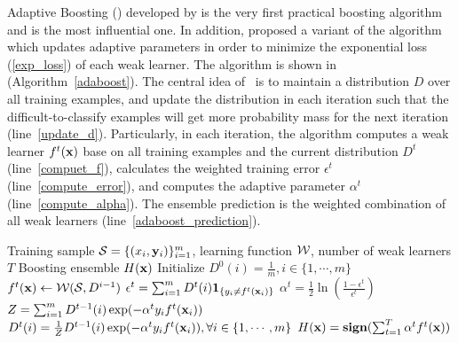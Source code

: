 {Adaptive Boosting (\adaboost) developed by \citet{Freund97a} is the very first practical boosting algorithm and is the most influential one.
In addition, \citet{Schapire99improved} proposed a variant of the algorithm which updates adaptive parameters in order to minimize the exponential loss (\ref{exp_loss}) of each weak learner.
The algorithm is shown in (Algorithm~\ref{adaboost}).
The central idea of \adaboost\ is to maintain a distribution $D$ over all training examples, and update the distribution in each iteration such that the difficult-to-classify examples will get more probability mass for the next iteration (line~\ref{update_d}).
Particularly, in each iteration, the algorithm computes a weak learner $f^t(\mathbf {x})$ base on all training examples and the current distribution $D^{t}$ (line~\ref{compuet_f}), calculates the weighted training error $\epsilon^t$ (line~\ref{compute_error}), and computes the adaptive parameter $\alpha^t$ (line~\ref{compute_alpha}).
The ensemble prediction is the weighted combination of all weak learners (line~\ref{adaboost_prediction}).

\begin{algorithm}
\caption{\adaboost}
\label{adaboost}
\begin{algorithmic}[1]
	\REQUIRE Training sample $\mathcal{S} = \{(x_i,\mathbf {y}_i)\}_{i=1}^m$, learning function $\mathcal{W}$, number of weak learners $T$
	\ENSURE Boosting ensemble $H(\mathbf {x})$
	\STATE Initialize $D^0(i)=\frac{1}{m},i\in\{1,\cdots,m\}$
		\STATE $f^t(\mathbf {x})\leftarrow\mathcal{W}(\mathcal{S},D^{i-1})$ \label{compuet_f}
		\STATE $\epsilon^t = \sum_{i=1}^{m}D^t(i)\mathbf{1}_{\{y_i\neq f^t(\mathbf {x}_i)\}}$ \label{compute_error}
		\STATE $\alpha^{t} = \frac{1}{2}\ln\left(\frac{1-\epsilon^t}{\epsilon^t}\right)$ \label{compute_alpha}
		\STATE $Z=\sum_{i=1}^{m}D^{t-1}(i)\exp(-\alpha^ty_if^t(\mathbf {x}_i))$
		\STATE $D^t(i) = \frac{1}{Z}D^{t-1}(i)\exp(-\alpha^ty_if^t(\mathbf {x}_i)),\forall i\in\{1,\cdots,m\}$ \label{update_d}
	\ENDFOR
	\RETURN $H(\mathbf {x}) = \textbf{sign}(\sum_{t=1}^T\alpha^tf^t(\mathbf {x}))$ \label{adaboost_prediction}
\end{algorithmic}
\end{algorithm}

}
